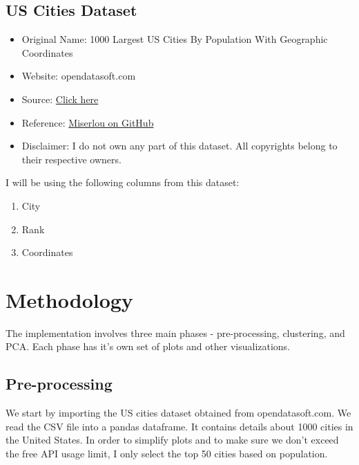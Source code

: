 \documentclass[12pt, a4paper]{report}
\begin{document}
\subsection*{US Cities Dataset}
\begin{itemize}
	\item Original Name: 1000 Largest US Cities By Population With Geographic Coordinates
	\item Website: opendatasoft.com
	\item Source: \href{https://public.opendatasoft.com/explore/dataset/1000-largest-us-cities-by-population-with-geographic-coordinates/export/?sort=-rank&dataChart=eyJxdWVyaWVzIjpbeyJjb25maWciOnsiZGF0YXNldCI6IjEwMDAtbGFyZ2VzdC11cy1jaXRpZXMtYnktcG9wdWxhdGlvbi13aXRoLWdlb2dyYXBoaWMtY29vcmRpbmF0ZXMiLCJvcHRpb25zIjp7InNvcnQiOiItcmFuayJ9fSwiY2hhcnRzIjpbeyJhbGlnbk1vbnRoIjp0cnVlLCJ0eXBlIjoiY29sdW1uIiwiZnVuYyI6IkFWRyIsInlBeGlzIjoicmFuayIsInNjaWVudGlmaWNEaXNwbGF5Ijp0cnVlLCJjb2xvciI6IiNGRjUxNUEifV0sInhBeGlzIjoiY2l0eSIsIm1heHBvaW50cyI6NTAsInNvcnQiOiIifV0sInRpbWVzY2FsZSI6IiIsImRpc3BsYXlMZWdlbmQiOnRydWUsImFsaWduTW9udGgiOnRydWV9}{Click here}
	\item Reference: \href{https://gist.github.com/Miserlou/c5cd8364bf9b2420bb29#file-cities-json}{Miserlou on GitHub} 
	\item Disclaimer: I do not own any part of this dataset. All copyrights belong to their respective owners. 
\end{itemize}
I will be using the following columns from this dataset:
\begin{enumerate}
	\item City
	\item Rank
	\item Coordinates 
\end{enumerate}
\newpage

\section*{Methodology}	
The implementation involves three main phases - pre-processing, clustering, and PCA. Each phase has it's own set of plots and other visualizations. 
\subsection*{Pre-processing}
We start by importing the US cities dataset obtained from opendatasoft.com. We read the CSV file into a pandas dataframe. It contains details about 1000 cities in the United States. In order to simplify plots and to make sure we don't exceed the free API usage limit, I only select the top 50 cities based on population. 
\end{document}
